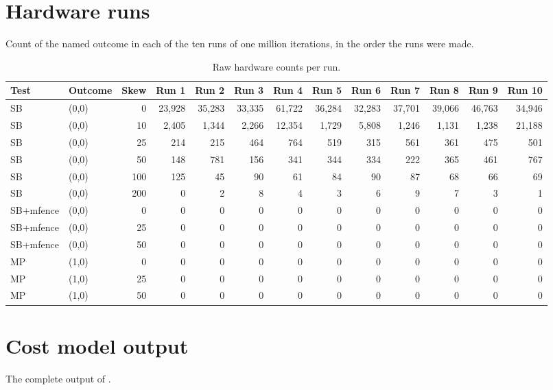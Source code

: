 \section{Hardware runs}
Count of the named outcome in each of the ten runs of one million iterations, in the order the runs were made.

\begin{table}[!htbp]
\centering\scriptsize
\caption{Raw hardware counts per run.}
\label{tab:raw}
\begin{tabular}{@{}llrrrrrrrrrrr@{}}
\toprule
Test & Outcome & Skew & Run 1 & Run 2 & Run 3 & Run 4 & Run 5 & Run 6 & Run 7 & Run 8 & Run 9 & Run 10\\
\midrule
SB & (0,0) & 0 & 23{,}928 & 35{,}283 & 33{,}335 & 61{,}722 & 36{,}284 & 32{,}283 & 37{,}701 & 39{,}066 & 46{,}763 & 34{,}946\\
SB & (0,0) & 10 & 2{,}405 & 1{,}344 & 2{,}266 & 12{,}354 & 1{,}729 & 5{,}808 & 1{,}246 & 1{,}131 & 1{,}238 & 21{,}188\\
SB & (0,0) & 25 & 214 & 215 & 464 & 764 & 519 & 315 & 561 & 361 & 475 & 501\\
SB & (0,0) & 50 & 148 & 781 & 156 & 341 & 344 & 334 & 222 & 365 & 461 & 767\\
SB & (0,0) & 100 & 125 & 45 & 90 & 61 & 84 & 90 & 87 & 68 & 66 & 69\\
SB & (0,0) & 200 & 0 & 2 & 8 & 4 & 3 & 6 & 9 & 7 & 3 & 1\\
SB+mfence & (0,0) & 0 & 0 & 0 & 0 & 0 & 0 & 0 & 0 & 0 & 0 & 0\\
SB+mfence & (0,0) & 25 & 0 & 0 & 0 & 0 & 0 & 0 & 0 & 0 & 0 & 0\\
SB+mfence & (0,0) & 50 & 0 & 0 & 0 & 0 & 0 & 0 & 0 & 0 & 0 & 0\\
MP & (1,0) & 0 & 0 & 0 & 0 & 0 & 0 & 0 & 0 & 0 & 0 & 0\\
MP & (1,0) & 25 & 0 & 0 & 0 & 0 & 0 & 0 & 0 & 0 & 0 & 0\\
MP & (1,0) & 50 & 0 & 0 & 0 & 0 & 0 & 0 & 0 & 0 & 0 & 0\\
\bottomrule
\end{tabular}
\end{table}

\section{Cost model output}
The complete output of .

